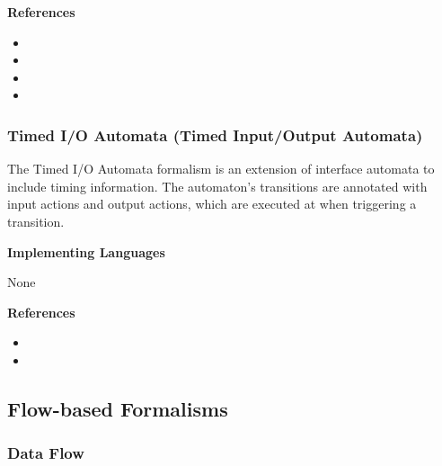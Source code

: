 \textbf{References}
\begin{itemize}
	
\item {}
	
\item {}
	
\item {}
	
\item {}
\end{itemize}



\subsubsection{Timed I/O Automata (Timed Input/Output Automata)}
\label{subsecF:TimedI/OAutomata}


The Timed I/O Automata formalism is an extension of interface automata to include timing information. The automaton's transitions are annotated with input actions and output actions, which are executed at when triggering a transition.

\textbf{Implementing Languages}

None





\textbf{References}
\begin{itemize}
	
\item {}
	
\item {}
\end{itemize}

\subsection{Flow-based Formalisms}

\subsubsection{Data Flow}
\label{subsecF:DataFlow}


